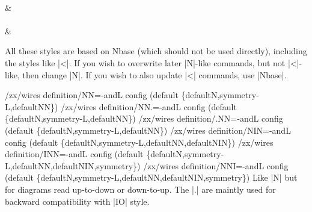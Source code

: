 \documentclass[a4paper]{ltxdoc}
\begin{document}
{\begin{pgfmanualentry}
\begin{codeexample}[width=3cm]
  \begin{ZX}
    \zxX{\alpha} \ar[N,rd] \\
                               & \zxZ{\beta}\\
    \zxX{\alpha} \ar[N={L=1.2},rd] \\
                               & \zxZ{\beta}
  \end{ZX}
\end{codeexample}
All these styles are based on Nbase (which should not be used directly), including the styles like |<|. If you wish to overwrite later |N|-like commands, but not |<|-like, then change |N|. If you wish to also update |<| commands, use |Nbase|.
\end{pgfmanualentry}



\begin{pgfmanualentry}
  \makeatletter
  \def\extrakeytext{style, }
  \extractkey/zx/wires definition/NN=-andL config (default \{defaultN,symmetry-L,defaultNN\})\@nil%
  \extractkey/zx/wires definition/NN.=-andL config (default \{defaultN,symmetry-L,defaultNN\})\@nil%
  \extractkey/zx/wires definition/.NN=-andL config (default \{defaultN,symmetry-L,defaultNN\})\@nil%
  \extractkey/zx/wires definition/NIN=-andL config (default \{defaultN,symmetry-L,defaultNN,defaultNIN\})\@nil%
  \extractkey/zx/wires definition/INN=-andL config (default \{defaultN,symmetry-L,defaultNN,defaultNIN,symmetry\})\@nil%
  \extractkey/zx/wires definition/NNI=-andL config (default \{defaultN,symmetry-L,defaultNN,defaultNIN,symmetry\})\@nil%
  \makeatother
  \pgfmanualbody
  Like |N| but for diagrams read up-to-down or down-to-up. The |.| are maintly used for backward compatibility with |IO| style.
\end{pgfmanualentry}

}
\end{document}
